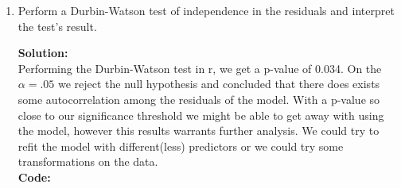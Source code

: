 \documentclass[12pt]{article}
\makeatletter
\theoremstyle{homework}
\newenvironment{exercise}[1]
{\def\@currentlabel{#1}\exercisecore}
{\endexercisecore}
\newcommand{\localhead}[1]{\par\smallskip\noindent\textbf{#1}\nobreak\\}%
\newcommand\solution{\localhead{Solution:}}
\makeatother
\begin{document}
\begin{exercise}{3}
\begin{enumerate}
    \item Perform a Durbin-Watson test of independence in the residuals and interpret the test's result.\\
    \solution Performing the Durbin-Watson test in r, we get a p-value of 0.034. On the $\alpha = .05$ we reject the null hypothesis 
    and concluded that there does exists some autocorrelation among the residuals of the model. With a p-value so close to our significance 
    threshold we might be able to get away with using the model, however this results warrants further analysis. We could try to refit the model 
    with different(less) predictors or we could try some transformations on the data. \\
    \textbf{Code:}
    \begin{center}
    
    \end{center} 
    \newpage
    





\end{enumerate}
\end{exercise}
\end{document}
